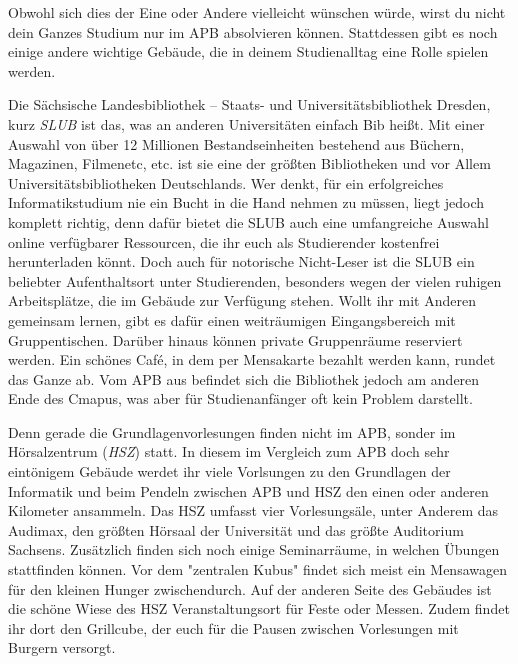 
Obwohl sich dies der Eine oder Andere vielleicht wünschen würde, wirst du nicht dein Ganzes Studium nur im APB absolvieren können.
Stattdessen gibt es noch einige andere wichtige Gebäude, die in deinem Studienalltag eine Rolle spielen werden.


Die Sächsische Landesbibliothek – Staats- und Universitätsbibliothek Dresden, kurz \emph{SLUB} ist das, was an anderen Universitäten einfach Bib heißt.
Mit einer Auswahl von über 12 Millionen Bestandseinheiten bestehend aus Büchern, Magazinen, Filmenetc, etc. ist sie eine der größten Bibliotheken und vor Allem Universitätsbibliotheken Deutschlands.
Wer denkt, für ein erfolgreiches Informatikstudium nie ein Bucht in die Hand nehmen zu müssen, liegt jedoch komplett richtig, denn dafür bietet die SLUB auch eine umfangreiche Auswahl online verfügbarer Ressourcen, die ihr euch als Studierender kostenfrei herunterladen könnt.
Doch auch für notorische Nicht-Leser ist die SLUB ein beliebter Aufenthaltsort unter Studierenden, besonders wegen der vielen ruhigen Arbeitsplätze, die im Gebäude zur Verfügung stehen.
Wollt ihr mit Anderen gemeinsam lernen, gibt es dafür einen weiträumigen Eingangsbereich mit Gruppentischen.
Darüber hinaus können private Gruppenräume reserviert werden. Ein schönes Café, in dem per Mensakarte bezahlt werden kann, rundet das Ganze ab.
Vom APB aus befindet sich die Bibliothek jedoch am anderen Ende des Cmapus, was aber für Studienanfänger oft kein Problem darstellt.


Denn gerade die Grundlagenvorlesungen finden nicht im APB, sonder im Hörsalzentrum (\emph{HSZ}) statt.
In diesem im Vergleich zum APB doch sehr eintönigem Gebäude werdet ihr viele Vorlsungen zu den Grundlagen der Informatik und beim Pendeln zwischen APB und HSZ den einen oder anderen Kilometer ansammeln.
Das HSZ umfasst vier Vorlesungsäle, unter Anderem das Audimax, den größten Hörsaal der Universität und das größte Auditorium Sachsens.
Zusätzlich finden sich noch einige Seminarräume, in welchen Übungen stattfinden können. Vor dem "zentralen Kubus" findet sich meist ein Mensawagen für den kleinen Hunger zwischendurch.
Auf der anderen Seite des Gebäudes ist die schöne Wiese des HSZ Veranstaltungsort für Feste oder Messen.
Zudem findet ihr dort den Grillcube, der euch für die Pausen zwischen Vorlesungen mit Burgern versorgt.


